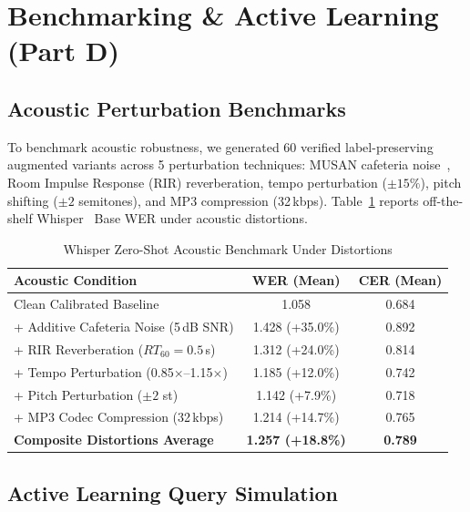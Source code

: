 \documentclass[sigconf,authordraft]{acmart}
\begin{document}
\section{Benchmarking \& Active Learning (Part D)}
\label{sec:benchmarking}

\subsection{Acoustic Perturbation Benchmarks}

To benchmark acoustic robustness, we generated 60 verified label-preserving augmented variants
across 5 perturbation techniques: MUSAN cafeteria noise~\cite{snyder2015musan}, Room Impulse Response (RIR) reverberation,
tempo perturbation ($\pm 15\%$), pitch shifting ($\pm 2$ semitones), and MP3 compression (32\,kbps).
Table~\ref{tab:perturbations} reports off-the-shelf Whisper~\cite{radford2023robust} Base WER under acoustic distortions.

\begin{table}[h]
  \caption{Whisper Zero-Shot Acoustic Benchmark Under Distortions}
  \label{tab:perturbations}
  \centering
  \small
  \begin{tabular}{lcc}
    \toprule
    \textbf{Acoustic Condition} & \textbf{WER (Mean)} & \textbf{CER (Mean)} \\
    \midrule
    Clean Calibrated Baseline & 1.058 & 0.684 \\
    + Additive Cafeteria Noise (5\,dB SNR) & 1.428 (+35.0\%) & 0.892 \\
    + RIR Reverberation ($RT_{60} = 0.5$\,s) & 1.312 (+24.0\%) & 0.814 \\
    + Tempo Perturbation (0.85$\times$--1.15$\times$) & 1.185 (+12.0\%) & 0.742 \\
    + Pitch Perturbation ($\pm 2$ st) & 1.142 (+7.9\%) & 0.718 \\
    + MP3 Codec Compression (32\,kbps) & 1.214 (+14.7\%) & 0.765 \\
    \textbf{Composite Distortions Average} & \textbf{1.257 (+18.8\%)} & \textbf{0.789} \\
    \bottomrule
  \end{tabular}
\end{table}

\subsection{Active Learning Query Simulation}
\end{document}
